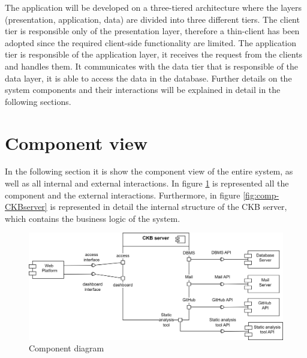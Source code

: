 The application will be developed on a three-tiered architecture where the layers (presentation, application, data) are divided into three different tiers. \newline
The client tier is responsible only of the presentation layer, therefore a thin-client has been adopted since the required client-side functionality are limited. The application tier is responsible of the application layer, it receives the request from the clients and handles them. It communicates with the data tier that is responsible of the data layer, it is able to access the data in the database. \newline
Further details on the system components and their interactions will be explained in detail in the following sections.

\section{Component view}
In the following section it is show the component view of the entire system, as well as all internal and external interactions. \newline
In figure \ref{fig:comp-hl} is represented all the component and the external interactions. Furthermore, in figure \ref{fig:comp-CKBserver} is represented in detail the internal structure of the CKB server, which contains the business logic of the system.

\begin{figure}[h]
    \centering
    \includegraphics[width=\textwidth]{images/component-hl.png}
    \caption{Component diagram}
    \label{fig:comp-hl}
\end{figure}

